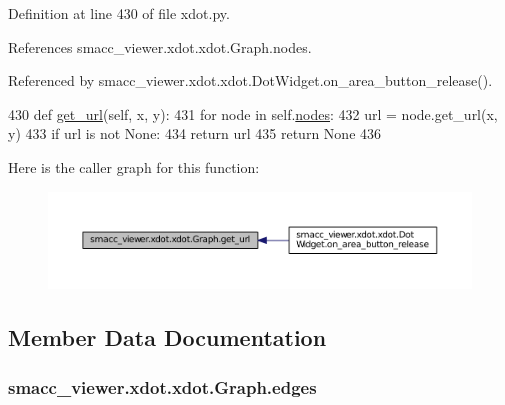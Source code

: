 Definition at line 430 of file xdot.\+py.



References smacc\+\_\+viewer.\+xdot.\+xdot.\+Graph.\+nodes.



Referenced by smacc\+\_\+viewer.\+xdot.\+xdot.\+Dot\+Widget.\+on\+\_\+area\+\_\+button\+\_\+release().


\begin{DoxyCode}
430     \textcolor{keyword}{def }\hyperlink{classsmacc__viewer_1_1xdot_1_1xdot_1_1Graph_adb1cd887622d6e38a2549a5d0941dd7e}{get\_url}(self, x, y):
431         \textcolor{keywordflow}{for} node \textcolor{keywordflow}{in} self.\hyperlink{classsmacc__viewer_1_1xdot_1_1xdot_1_1Graph_afcc48b27e46e8e0ddd98a35d5de99d16}{nodes}:
432             url = node.get\_url(x, y)
433             \textcolor{keywordflow}{if} url \textcolor{keywordflow}{is} \textcolor{keywordflow}{not} \textcolor{keywordtype}{None}:
434                 \textcolor{keywordflow}{return} url
435         \textcolor{keywordflow}{return} \textcolor{keywordtype}{None}
436 
\end{DoxyCode}


Here is the caller graph for this function\+:
\nopagebreak
\begin{figure}[H]
\begin{center}
\leavevmode
\includegraphics[width=350pt]{classsmacc__viewer_1_1xdot_1_1xdot_1_1Graph_adb1cd887622d6e38a2549a5d0941dd7e_icgraph}
\end{center}
\end{figure}




\subsection{Member Data Documentation}
\subsubsection[{\texorpdfstring{edges}{edges}}]{\setlength{\rightskip}{0pt plus 5cm}smacc\+\_\+viewer.\+xdot.\+xdot.\+Graph.\+edges}\hypertarget{classsmacc__viewer_1_1xdot_1_1xdot_1_1Graph_af2a8b69040a55cf35b72d94790d1f323}{}\label{classsmacc__viewer_1_1xdot_1_1xdot_1_1Graph_af2a8b69040a55cf35b72d94790d1f323}


